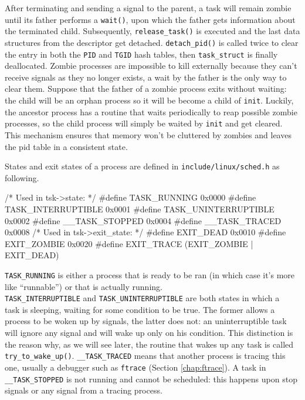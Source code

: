 \documentclass[10pt]{book}
\begin{document}
After terminating and sending a signal to the parent, a task will remain zombie until its father performs a \verb|wait()|, upon which the father gets information about the terminated child. Subsequently, \verb|release_task()| is executed and the last data structures from the descriptor get detached. \verb|detach_pid()| is called twice to clear the entry in both the \verb|PID| and \verb|TGID| hash tables, then \verb|task_struct| is finally deallocated. Zombie processes are impossible to kill externally because they can't receive signals as they no longer exists, a wait by the father is the only way to clear them. Suppose that the father of a zombie process exits without waiting: the child will be an orphan process so it will be become a child of \verb|init|. Luckily, the ancestor process has a routine that waits periodically to reap possible zombie processes, so the child process will simply be waited by \verb|init| and get cleared. This mechanism ensures that memory won't be cluttered by zombies and leaves the pid table in a consistent state.

States and exit states of a process are defined in \verb|include/linux/sched.h| as following.
\begin{code}
/* Used in tsk->state: */
#define TASK_RUNNING    0x0000
#define TASK_INTERRUPTIBLE  0x0001
#define TASK_UNINTERRUPTIBLE    0x0002
#define __TASK_STOPPED			0x0004
#define __TASK_TRACED			0x0008
/* Used in tsk->exit_state: */
#define EXIT_DEAD   0x0010
#define EXIT_ZOMBIE 0x0020
#define EXIT_TRACE  (EXIT_ZOMBIE | EXIT_DEAD)
\end{code}
\verb|TASK_RUNNING| is either a process that is ready to be ran (in which case it's more like ``runnable'') or that is actually running. \\
\verb|TASK_INTERRUPTIBLE| and \verb|TASK_UNINTERRUPTIBLE| are both states in which a\\task is sleeping, waiting for some condition to be true. The former allows a process to be woken up by signals, the latter does not: an uninterruptible task will ignore any signal and will wake up only on his condition. This distinction is the reason why, as we will see later, the routine that wakes up any task is called \verb|try_to_wake_up()|.  \verb|__TASK_TRACED| means that another process is tracing this one, usually a debugger such as \verb|ftrace| (Section \ref{chap:ftrace}). A task in \verb|__TASK_STOPPED| is not running and cannot be scheduled: this happens upon stop signals or any signal from a tracing process.
\end{document}
